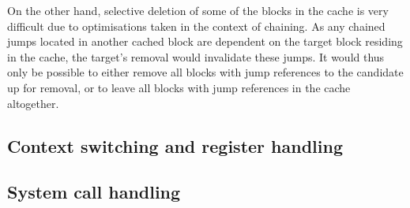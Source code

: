 On the other hand, selective deletion of some of the blocks in the cache is very difficult due to optimisations taken in the context of chaining.
As any chained jumps located in another cached block are dependent on the target block residing in the cache, the target's removal would invalidate these jumps.
It would thus only be possible to either remove all blocks with jump references to the candidate up for removal, or to leave all blocks with jump references in the cache altogether.


\subsection{Context switching and register handling}
\label{sec:context-switch-reg-handle}


\subsection{System call handling}
\label{sec:syscall-handling}





